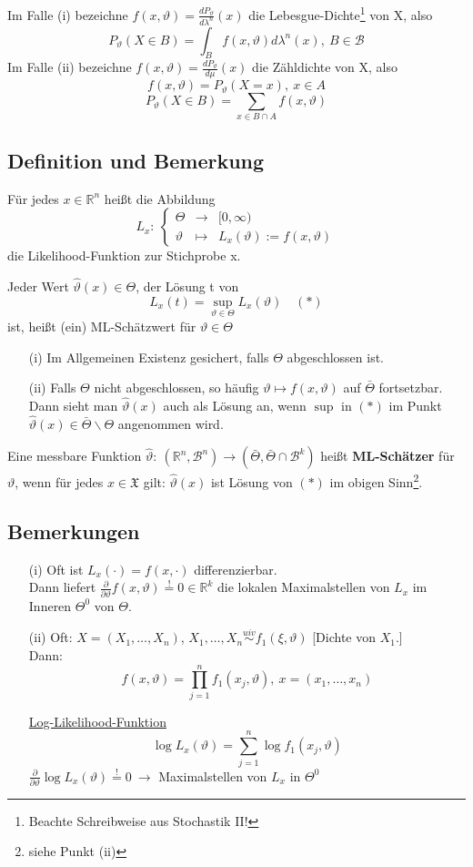 \documentclass[a4paper,11pt,twoside,titlepage]{article}
\newcommand{\R}{{\mathbb R}}
\newcommand{\XX}{{\mathfrak X}} %
\newcommand\BB{ \mathcal{B} } %
\newcommand{\uiv}{\ensuremath{\stackrel{uiv}{\sim}}}
\begin{document}
Im Falle (i) bezeichne $f(x,\vartheta)=\frac{dP_\vartheta}{d\lambda^n}(x)$ die Lebesgue-Dichte\footnote{Beachte Schreibweise aus Stochastik II!} von X, also 
\[P_\vartheta(X\in B)=\int_B f(x,\vartheta)d\lambda^n(x),\ B\in\BB\]
Im Falle (ii) bezeichne $f(x,\vartheta)=\frac{dP_\vartheta}{d\mu}(x)$ die Zähldichte von X, also 
\[f(x,\vartheta)=P_\vartheta(X=x),\ x\in A\]
\[P_\vartheta(X\in B)=\sum_{x\in B\cap A}f(x,\vartheta)\]

\subsection{Definition und Bemerkung}
Für jedes $x\in\R^n$ heißt die Abbildung
\[L_x:\ \left\{\begin{array}{rcl}\Theta&\to&[0,\infty)\\\vartheta&\mapsto&L_x(\vartheta):=f(x,\vartheta)\end{array}\right.\]
die Likelihood-Funktion zur Stichprobe x.

Jeder Wert $\hat\vartheta(x)\in\Theta$, der Lösung t von
\[L_x(t)=\sup_{\vartheta\in\Theta}L_x(\vartheta)\quad(\ast)\]
ist, heißt (ein) ML-Schätzwert für $\vartheta\in\Theta$

\begin{itemize}
\item[(i)] Im Allgemeinen Existenz gesichert, falls $\Theta$ abgeschlossen ist.
\item[(ii)] Falls $\Theta$ nicht abgeschlossen, so häufig $\vartheta\mapsto f(x,\vartheta)$ auf $\bar\Theta$ fortsetzbar.\\
Dann sieht man $\hat\vartheta(x)$ auch als Lösung an, wenn $\sup$ in $(\ast)$ im Punkt $\hat\vartheta(x)\in\bar\Theta\backslash\Theta$ angenommen wird.
\end{itemize}

Eine messbare Funktion $\hat\vartheta:\ (\R^n,\BB^n)\to(\bar\Theta,\bar\Theta\cap\BB^k)$ heißt \textbf{ML-Schätzer} für $\vartheta$, wenn für jedes $x\in\XX$ gilt: $\hat\vartheta(x)$ ist Lösung von $(\ast)$ im obigen Sinn\footnote{siehe Punkt (ii)}.

\subsection{Bemerkungen}
\begin{itemize}
\item[(i)] Oft ist $L_x(\cdot)=f(x,\cdot)$ differenzierbar.\\
Dann liefert $\frac{\partial}{\partial\vartheta}f(x,\vartheta)\stackrel{!}{=}0\in\R^k$ die lokalen Maximalstellen von $L_x$ im Inneren $\Theta^0$ von $\Theta$.
\item[(ii)] Oft: $X=(X_1,\ldots,X_n)$, $X_1,\ldots,X_n\uiv f_1(\xi,\vartheta)$ [Dichte von $X_1$.]\\
Dann:
\[f(x,\vartheta)=\prod_{j=1}^n f_1(x_j,\vartheta),\ x=(x_1,\ldots,x_n)\]

\underline{Log-Likelihood-Funktion}
\[\log L_x(\vartheta)=\sum_{j=1}^n\log f_1(x_j,\vartheta)\]
$\frac{\partial}{\partial\vartheta}\log L_x(\vartheta)\stackrel{!}{=}0\ \rightarrow$ Maximalstellen von $L_x$ in $\Theta^0$
\end{itemize}
\end{document}
